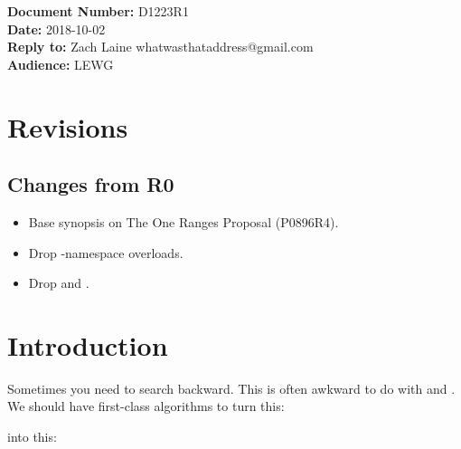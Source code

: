 \documentclass{article}
\begin{document}
\title{\textbf{\Large {}}}
\date{}
{\let\newpage\relax\maketitle}

\noindent\textbf{Document Number:} D1223R1\\
\textbf{Date:} 2018-10-02\\
\textbf{Reply to:} Zach Laine whatwasthataddress@gmail.com\\
\textbf{Audience:} LEWG

\section{Revisions}

\subsection{Changes from R0}

\begin{itemize}
  \item Base synopsis on The One Ranges Proposal (P0896R4).
  \item Drop -namespace overloads.
  \item Drop  and .
\end{itemize}

\section{Introduction}

\label{sec:intro}

Sometimes you need to search backward.  This is often awkward to do with
 and .  We should have first-class
algorithms to turn this:



into this:





\end{document}

